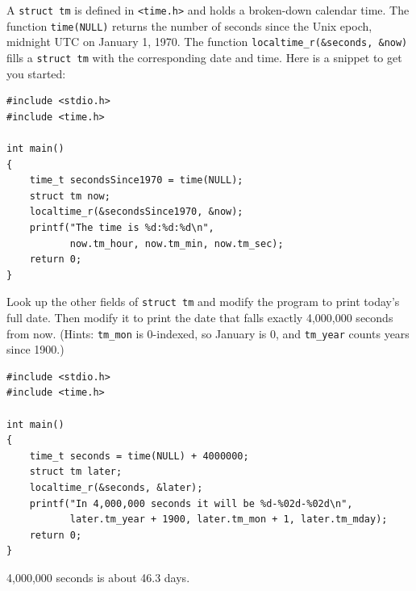 \begin{Exercise}[title={What Time Is It?}, label=c_time]
A \texttt{struct tm} is defined in \texttt{<time.h>} and holds a
broken-down calendar time. The function \texttt{time(NULL)} returns the
number of seconds since the Unix epoch, midnight UTC on January 1, 1970.
The function \texttt{localtime\_r(\&seconds, \&now)} fills a
\texttt{struct tm} with the corresponding date and time. Here is a snippet
to get you started:

\begin{verbatim}
#include <stdio.h>
#include <time.h>

int main()
{
    time_t secondsSince1970 = time(NULL);
    struct tm now;
    localtime_r(&secondsSince1970, &now);
    printf("The time is %d:%d:%d\n",
           now.tm_hour, now.tm_min, now.tm_sec);
    return 0;
}
\end{verbatim}

Look up the other fields of \texttt{struct tm} and modify the program to
print today's full date. Then modify it to print the date that falls
exactly 4,000,000 seconds from now. (Hints: \texttt{tm\_mon} is
0-indexed, so January is 0, and \texttt{tm\_year} counts years since
1900.)
\end{Exercise}
\begin{Answer}[ref=c_time]
\begin{verbatim}
#include <stdio.h>
#include <time.h>

int main()
{
    time_t seconds = time(NULL) + 4000000;
    struct tm later;
    localtime_r(&seconds, &later);
    printf("In 4,000,000 seconds it will be %d-%02d-%02d\n",
           later.tm_year + 1900, later.tm_mon + 1, later.tm_mday);
    return 0;
}
\end{verbatim}
4,000,000 seconds is about 46.3 days.
\end{Answer}
